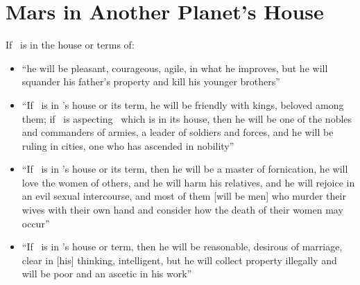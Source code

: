 \section{Mars in Another Planet's House}
If \Mars\, is in the house or terms of:
\begin{itemize}[topsep=0em,itemsep=0em]
\item[\Saturn] ``he will be pleasant, courageous, agile, in what he improves, but he will squander his father's property and kill his younger brothers''

\item[\Jupiter] ``If \Mars\, is in \Jupiter's house or its term, he will be friendly with kings, beloved among them; if \Jupiter\, is aspecting \Mars\, which is in its house, then he will be one of the nobles and commanders of armies, a leader of soldiers and forces, and he will be ruling in cities, one who has ascended in nobility''

\item[\Venus] ``If \Mars\, is in \Venus's house or its term, then he will be a master of fornication, he will love the women of others, and he will harm his relatives, and he will rejoice in an evil sexual intercourse, and most of them [will be men] who murder their wives with their own hand and consider how the death of their women may occur''

\item[\Mercury] ``If \Mars\, is in \Mercury's house or term, then he will be reasonable, desirous of marriage, clear in [his] thinking, intelligent, but he will collect property illegally and will be poor and an ascetic in his work''
\end{itemize}